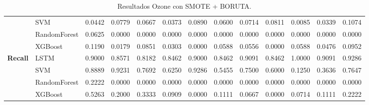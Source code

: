 \begin{table}[h]
\begin{adjustbox}{max width=15cm}
\begin{tabular}{|c|l|r|r|r|r|r|r|r|r|r|r|r|}
			& SVM &  0.0442 &  0.0779 &  0.0667 &  0.0373 &  0.0890 &  0.0600 &  0.0714 &  0.0811 &  0.0085 &  0.0339 &  0.1074 \\
			& RandomForest &  0.0625 &  0.0000 &  0.0000 &  0.0000 &  0.0000 &  0.0000 &  0.0000 &  0.0000 &  0.0000 &  0.0000 &  0.0000 \\
			& XGBoost &  0.1190 &  0.0179 &  0.0851 &  0.0303 &  0.0000 &  0.0588 &  0.0556 &  0.0000 &  0.0588 &  0.0476 &  0.0952 \\
			\hline
			\textbf{Recall} & LSTM &  0.9000 &  0.8571 &  0.8182 &  0.8462 &  0.9000 &  0.8462 &  0.9091 &  0.8462 &  1.0000 &  0.9091 &  0.9286 \\
			& SVM &  0.8889 &  0.9231 &  0.7692 &  0.6250 &  0.9286 &  0.5455 &  0.7500 &  0.6000 &  0.1250 &  0.3636 &  0.7647 \\
			& RandomForest &  0.2222 &  0.0000 &  0.0000 &  0.0000 &  0.0000 &  0.0000 &  0.0000 &  0.0000 &  0.0000 &  0.0000 &  0.0000 \\
			& XGBoost &  0.5263 &  0.2000 &  0.3333 &  0.0909 &  0.0000 &  0.1111 &  0.0667 &  0.0000 &  0.0714 &  0.1111 &  0.2222 \\
			\hline
		\end{tabular}
	\end{adjustbox}
	\caption{Resultados Ozone con SMOTE + BORUTA.}
	\label{tab:Ozone_SMOTE_BORUTA}
\end{table}
\newpage
